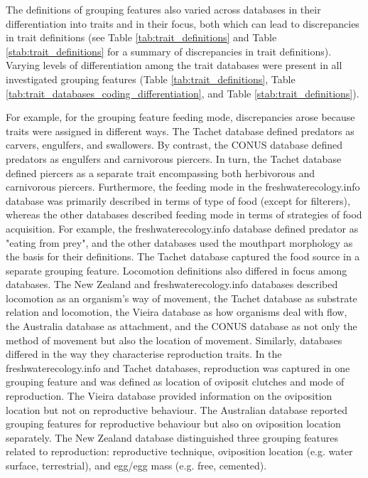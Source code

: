 \documentclass[12pt]{article}
\begin{document}
The definitions of grouping features also varied across databases in their differentiation into traits and in their focus, both which can lead to discrepancies in trait definitions (see Table \ref{tab:trait_definitions} and Table \ref{stab:trait_definitions} for a summary of discrepancies in trait definitions). Varying levels of differentiation among the trait databases were present in all investigated grouping features (Table \ref{tab:trait_definitions}, Table \ref{tab:trait_databases_coding_differentiation}, and Table \ref{stab:trait_definitions}).

For example, for the grouping feature feeding mode, discrepancies arose because traits were assigned in different ways. The Tachet database defined predators as carvers, engulfers, and swallowers. By contrast, the CONUS database defined predators as engulfers and carnivorous piercers. In turn, the Tachet database defined piercers as a separate trait encompassing both herbivorous and carnivorous piercers. Furthermore, the feeding mode in the freshwaterecology.info database was primarily described in terms of type of food (except for filterers), whereas the other databases described feeding mode in terms of strategies of food acquisition. For example, the freshwaterecology.info database defined predator as "eating from prey", and the other databases used the mouthpart morphology as the basis for their definitions. The Tachet database captured the food source in a separate grouping feature. Locomotion definitions also differed in focus among databases. The New Zealand and freshwaterecology.info databases described locomotion as an organism’s way of movement, the Tachet database as substrate relation and locomotion, the Vieira database as how organisms deal with flow, the Australia database as attachment, and the CONUS database as not only the method of movement but also the location of movement. Similarly, databases differed in the way they characterise reproduction traits. In the freshwaterecology.info and Tachet databases, reproduction was captured in one grouping feature and was defined as location of oviposit clutches and mode of reproduction. The Vieira database provided information on the oviposition location but not on reproductive behaviour. The Australian database reported grouping features for reproductive behaviour but also on oviposition location separately. The New Zealand database distinguished three grouping features related to reproduction: reproductive technique, oviposition location (e.g. water surface, terrestrial), and egg/egg mass (e.g. free, cemented).
\end{document}
